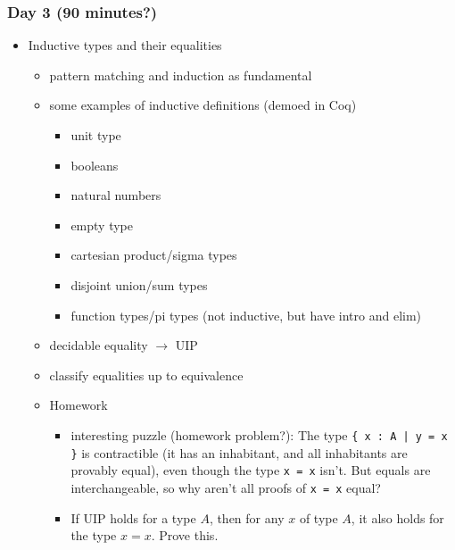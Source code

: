 \documentclass{article}
\begin{document}
\subsubsection*{Day 3 (90 minutes?)}
\begin{itemize}
  \item Inductive types and their equalities
    \begin{itemize}
      \item pattern matching and induction as fundamental
      \item some examples of inductive definitions (demoed in Coq)
      \begin{itemize}
        \item unit type
        \item booleans
        \item natural numbers
        \item empty type
        \item cartesian product/sigma types
        \item disjoint union/sum types
        \item function types/pi types (not inductive, but have intro and elim)
      \end{itemize}
      \item decidable equality $\to$ UIP
      \item classify equalities up to equivalence
      \item Homework
        \begin{itemize}
          \item
            interesting puzzle (homework problem?): The type \texttt{\{ x : A | y = x \}} is contractible (it has an inhabitant, and all inhabitants are provably equal), even though the type \texttt{x = x} isn't.  But equals are interchangeable, so why aren't all proofs of \texttt{x = x} equal?
          \item
            If UIP holds for a type $A$, then for any $x$ of type $A$, it also holds for the type $x = x$.  Prove this.
        \end{itemize}
      \end{itemize}
\end{itemize}
\end{document}
